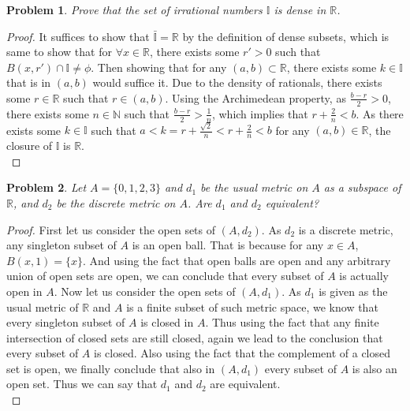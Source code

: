 \documentclass[paper=a4, fontsize=11pt]{scrartcl}
\newtheorem{problem}{Problem}
\begin{document}
\begin{problem}
	Prove that the set of irrational numbers $\mathbb{I}$ is dense in $\mathbb{R}$. \\
\end{problem}

\begin{proof}
	It suffices to show that $\bar{\mathbb{I}} = \mathbb{R}$ by the definition of dense subsets, which is same to show that for $\forall x \in \mathbb{R}$, there exists some $r'>0$ such that $B(x,r')\cap \mathbb{I} \neq \phi$. Then showing that for any $(a,b)\subset \mathbb{R}$, there exists some $k \in \mathbb{I}$ that is in $(a,b)$ would suffice it. Due to the density of rationals, there exists some $r \in \mathbb{R}$ such that $r \in (a,b)$. Using the Archimedean property, as $\frac{b-r}{2}>0$, there exists some $n \in \mathbb{N}$ such that $\frac{b-r}{2}> \frac{1}{n}$, which implies that $r+\frac{2}{n}<b$. As there exists some $k \in \mathbb{I}$ such that $a < k = r+\frac{\sqrt{2}}{n} < r+ \frac{2}{n} < b$ for any $(a,b) \in \mathbb{R}$, the closure of $\mathbb{I}$ is $\mathbb{R}$. \\
\end{proof}

\begin{problem}
	Let $A=\{0,1,2,3\}$ and $d_1$ be the usual metric on $A$ as a subspace of $\mathbb{R}$, and $d_2$ be the discrete metric on $A$. Are $d_1$ and $d_2$ equivalent? \\
\end{problem}

\begin{proof}
	First let us consider the open sets of $(A,d_2)$. As $d_2$ is a discrete metric, any singleton subset of $A$ is an open ball. That is because for any $x \in A$, $B(x,1)=\{x\}$. And using the fact that open balls are open and any arbitrary union of open sets are open, we can conclude that every subset of $A$ is actually open in $A$. Now let us consider the open sets of $(A,d_1)$. As $d_1$ is given as the usual metric of $\mathbb{R}$ and $A$ is a finite subset of such metric space, we know that every singleton subset of $A$ is closed in $A$. Thus using the fact that any finite intersection of closed sets are still closed, again we lead to the conclusion that every subset of $A$ is closed. Also using the fact that the complement of a closed set is open, we finally conclude that also in $(A,d_1)$ every subset of $A$ is also an open set. Thus we can say that $d_1$ and $d_2$ are equivalent. \\
\end{proof}
\end{document}
